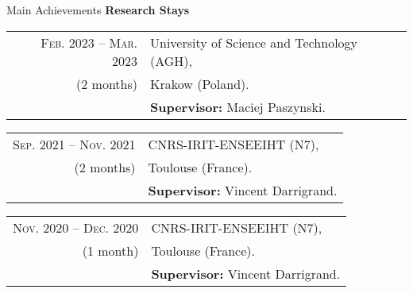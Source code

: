 \begin{frame}{Main Achievements}
\textbf{Research Stays}
\vspace{0.2cm}

\begin{small}
\begin{tabular}{rl}	
\textsc{Feb.} 2023 -- \textsc{Mar.} 2023 &University of Science and Technology (AGH),  \\
(2 months)& Krakow (Poland). \\
&\textbf{Supervisor:} Maciej Paszynski.\\
\end{tabular}


\begin{tabular}{rl}	
\textsc{Sep.} 2021 -- \textsc{Nov.} 2021&CNRS-IRIT-ENSEEIHT (N7),  \\
(2 months)& Toulouse (France). \\
&\textbf{Supervisor:} Vincent Darrigrand.\\
\end{tabular}


\begin{tabular}{rl}	
\textsc{Nov.} 2020 -- \textsc{Dec.} 2020&CNRS-IRIT-ENSEEIHT (N7),  \\
(1 month)& Toulouse (France). \\
&\textbf{Supervisor:} Vincent Darrigrand.\\
\end{tabular}
\end{small}

\end{frame}



